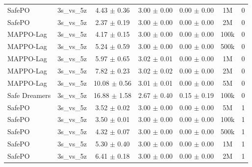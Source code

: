 \documentclass{article}
\begin{document}
\begin{longtable}{lcccccc}
SafePO & 3s\_vs\_5z & \textcolor{green!60!black}{4.43 $\pm$ 0.36} & \textcolor{green!60!black}{3.00 $\pm$ 0.00} & \textcolor{green!60!black}{0.00 $\pm$ 0.00} & 1M & 0 \\
SafePO & 3s\_vs\_5z & \textcolor{green!60!black}{2.37 $\pm$ 0.19} & \textcolor{green!60!black}{3.00 $\pm$ 0.00} & \textcolor{green!60!black}{0.00 $\pm$ 0.00} & 2M & 0 \\
MAPPO-Lag & 3s\_vs\_5z & \textcolor{green!60!black}{4.17 $\pm$ 0.15} & \textcolor{green!60!black}{3.00 $\pm$ 0.00} & \textcolor{green!60!black}{0.00 $\pm$ 0.00} & 100k & 0 \\
MAPPO-Lag & 3s\_vs\_5z & \textcolor{green!60!black}{5.24 $\pm$ 0.59} & \textcolor{green!60!black}{3.00 $\pm$ 0.00} & \textcolor{green!60!black}{0.00 $\pm$ 0.00} & 500k & 0 \\
MAPPO-Lag & 3s\_vs\_5z & \textcolor{green!60!black}{5.97 $\pm$ 0.65} & \textcolor{green!60!black}{3.02 $\pm$ 0.01} & \textcolor{green!60!black}{0.00 $\pm$ 0.00} & 1M & 0 \\
MAPPO-Lag & 3s\_vs\_5z & \textcolor{green!60!black}{7.82 $\pm$ 0.23} & \textcolor{green!60!black}{3.02 $\pm$ 0.02} & \textcolor{green!60!black}{0.00 $\pm$ 0.00} & 2M & 0 \\
MAPPO-Lag & 3s\_vs\_5z & \textcolor{green!60!black}{10.08 $\pm$ 0.56} & \textcolor{green!60!black}{3.01 $\pm$ 0.01} & \textcolor{green!60!black}{0.00 $\pm$ 0.00} & 5M & 0 \\
Safe Dreamers & 3s\_vs\_5z & 16.88 $\pm$ 1.58 & 2.67 $\pm$ 0.40 & 0.15 $\pm$ 0.19 & 100k & 0 \\
\midrule
SafePO & 3s\_vs\_5z & \textcolor{green!60!black}{3.52 $\pm$ 0.02} & \textcolor{green!60!black}{3.00 $\pm$ 0.00} & \textcolor{green!60!black}{0.00 $\pm$ 0.00} & 5M & 1 \\
SafePO & 3s\_vs\_5z & \textcolor{green!60!black}{3.50 $\pm$ 0.01} & \textcolor{green!60!black}{3.00 $\pm$ 0.00} & \textcolor{green!60!black}{0.00 $\pm$ 0.00} & 100k & 1 \\
SafePO & 3s\_vs\_5z & \textcolor{green!60!black}{4.32 $\pm$ 0.07} & \textcolor{green!60!black}{3.00 $\pm$ 0.00} & \textcolor{green!60!black}{0.00 $\pm$ 0.00} & 500k & 1 \\
SafePO & 3s\_vs\_5z & \textcolor{green!60!black}{5.30 $\pm$ 0.40} & \textcolor{green!60!black}{3.00 $\pm$ 0.00} & \textcolor{green!60!black}{0.00 $\pm$ 0.00} & 1M & 1 \\
SafePO & 3s\_vs\_5z & \textcolor{green!60!black}{6.41 $\pm$ 0.18} & \textcolor{green!60!black}{3.00 $\pm$ 0.00} & \textcolor{green!60!black}{0.00 $\pm$ 0.00} & 2M & 1 \\

\end{longtable}
\end{document}
